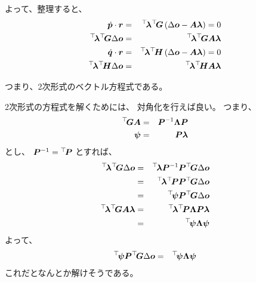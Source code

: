 \documentclass[11pt,a4j]{jarticle}
\begin{document}
よって、整理すると、
  \begin{eqnarray}
    \dot{\V{p}} \cdot \V{r}
      & = &
        \Tr{\V{\lambda}}\Tr{\M{G}}
        \left( \Delta \V{o} - \M{A} \V{\lambda} \right) = 0
  \\
    \Tr{\V{\lambda}}\Tr{\M{G}}\Delta\V{o}
      & = &
        \Tr{\V{\lambda}}\Tr{\M{G}}\M{A}\V{\lambda}
  \\
    \dot{\V{q}} \cdot \V{r}
      & = &
        \Tr{\V{\lambda}}\Tr{\M{H}}
        \left( \Delta \V{o} - \M{A} \V{\lambda} \right) = 0
  \\
    \Tr{\V{\lambda}}\Tr{\M{H}}\Delta\V{o}
      & = &
        \Tr{\V{\lambda}}\Tr{\M{H}}\M{A}\V{\lambda}
  \end{eqnarray}

つまり、2次形式のベクトル方程式である。

2次形式の方程式を解くためには、
対角化を行えば良い。
つまり、
  \begin{eqnarray}
    {}^{\top}\!{{\bm{G} }} {\bm{A} }
      & = &
        {\bm{P} }^{-1} {\bm{\Lambda} } {\bm{P} }
  \\
    {\bm{\psi}}
      & = &
        {\bm{P} } {\bm{\lambda}}
  \end{eqnarray}
とし、
${\bm{P} }^{-1} = {}^{\top}\!{{\bm{P} }}$ とすれば、 
  \begin{eqnarray}
    \Tr{\V{\lambda}} \Tr{\M{G}} \Delta\V{o}
      & = &
        \Tr{\V{\lambda}} \M{P}^{-1} \M{P} \Tr{\M{G}} \Delta\V{o}
  \\
      & = &
        \Tr{\V{\lambda}} \Tr{\M{P}} \M{P} \Tr{\M{G}} \Delta\V{o}
  \\
      & = &
        \Tr{\V{\psi}} \M{P} \Tr{\M{G}} \Delta\V{o}
  \\
    \Tr{\V{\lambda}}\Tr{\M{G}}\M{A}\V{\lambda}
      & = &
        \Tr{\V{\lambda}}\Tr{\M{P}}\M{\Lambda}\M{P}\V{\lambda}
  \\
      & = &
        \Tr{\V{\psi}} \M{\Lambda} \V{\psi}
  \end{eqnarray}
よって、
  \begin{eqnarray}
    {}^{\top}\!{{\bm{\psi}}} {\bm{P} } {}^{\top}\!{{\bm{G} }} \Delta{\bm{o}}
      & = &
        {}^{\top}\!{{\bm{\psi}}} {\bm{\Lambda} } {\bm{\psi}}
  \end{eqnarray}
これだとなんとか解けそうである。
\end{document}
